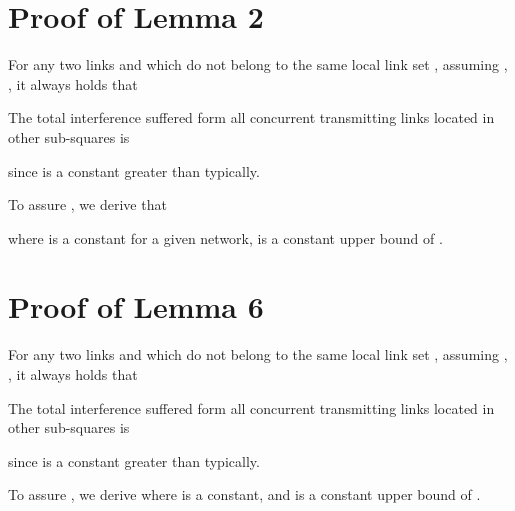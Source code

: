 \documentclass[journal]{IEEEtran}
\begin{document}
\section{Proof of Lemma 2}
\begin{IEEEproof}
For any two links  and  which do not belong to the same local link set , assuming ,
, it always holds that


The total interference  suffered form all concurrent transmitting links located in other sub-squares is




since  is a constant greater than  typically.

To assure {\small{}}, we derive that

where {\small{ }} is a constant for a given network,  is a constant upper bound of .
\end{IEEEproof}



\section{Proof of Lemma 6}
\begin{IEEEproof}
For any two links  and  which do not belong to the same local link set , assuming ,
, it always holds that
   
The total interference  suffered form all concurrent transmitting links located in other sub-squares is

\vspace*{-0.5\baselineskip}


since  is a constant greater than  typically.

To assure , we derive
{\small{}}
where  is a constant, and  is a constant upper bound of .
\vspace*{-0.5\baselineskip}
\end{IEEEproof}
\end{document}
